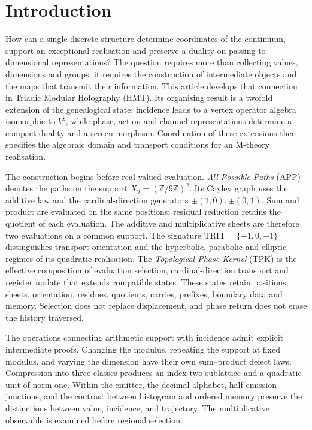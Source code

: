 \section{Introduction}
\label{iv:introduccion}
\begingroup
\fontsize{10.5}{13.2}\selectfont
\setlength{\parskip}{1pt plus .5pt minus .25pt}

How can a single discrete structure determine coordinates of the
continuum, support an exceptional realisation and preserve a duality
on passing to dimensional representations? The question requires more
than collecting values, dimensions and groups: it requires the construction
of intermediate objects and the maps that transmit their information.
This article develops that connection in Triadic Modular Holography (HMT).
Its organising result is a twofold extension of the genealogical state:
incidence leads to a vertex operator algebra isomorphic to
\(V^\natural\), while phase, action and channel representations
determine a compact duality and a screen morphism. Coordination of
these extensions then specifies the algebraic domain and transport
conditions for an M-theory realisation.

The construction begins before real-valued evaluation.
\emph{All Possible Paths} (APP) denotes the paths on the support
\(X_9=(\mathbb Z/9\mathbb Z)^2\). Its Cayley graph uses the additive
law and the cardinal-direction generators \(\pm(1,0),\pm(0,1)\).
Sum and product are evaluated on the same positions; residual reduction
retains the quotient of each evaluation. The additive and multiplicative
sheets are therefore two evaluations on a common support.
The signature \(\mathrm{TRIT}=\{-1,0,+1\}\) distinguishes transport
orientation and the hyperbolic, parabolic and elliptic regimes of its
quadratic realisation. The \emph{Topological Phase Kernel} (TPK) is the
effective composition of evaluation selection, cardinal-direction
transport and register update that extends compatible states. These
states retain positions, sheets, orientation, residues, quotients,
carries, prefixes, boundary data and memory. Selection does not replace
displacement, and phase return does not erase the history traversed.

The operations connecting arithmetic support with incidence admit
explicit intermediate proofs. Changing the modulus, repeating the support
at fixed modulus, and varying the dimension have their own sum--product
defect laws. Compression into three classes produces an index-two
sublattice and a quadratic unit of norm one. Within the emitter, the
decimal alphabet, half-emission junctions, and the contrast between
histogram and ordered memory preserve the distinctions between value,
incidence, and trajectory. The multiplicative observable is examined
before regional selection.

